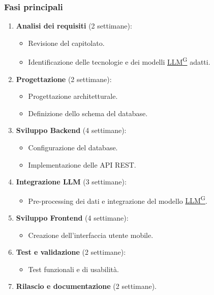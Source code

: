 \documentclass{article}
\begin{document}
                \subsubsection{Fasi principali}  %
                \begin{enumerate}
                    \item \textbf{Analisi dei requisiti} (2 settimane):
                    \begin{itemize}
                        \item Revisione del capitolato.
                        \item Identificazione delle tecnologie e dei modelli \href{https://code7crusaders.github.io/docs/RTB/documentazione_interna/glossario.html#llm-large-language-model}{LLM\textsuperscript{G}} adatti.
                    \end{itemize}
                    \item \textbf{Progettazione} (2 settimane):
                    \begin{itemize}
                        \item Progettazione architetturale.
                        \item Definizione dello schema del database.
                    \end{itemize}
                    \item \textbf {Sviluppo Backend} (4 settimane):
                    \begin{itemize}
                        \item Configurazione del database.
                        \item Implementazione delle API REST.
                    \end{itemize}
                    \item \textbf{Integrazione LLM} (3 settimane):
                    \begin{itemize}
                        \item Pre-processing dei dati e integrazione del modello \href{https://code7crusaders.github.io/docs/RTB/documentazione_interna/glossario.html#llm-large-language-model}{LLM\textsuperscript{G}}.
                    \end{itemize}
                    \item \textbf{Sviluppo Frontend} (4 settimane):
                    \begin{itemize}
                        \item Creazione dell'interfaccia utente mobile.
                    \end{itemize}
                    \item \textbf{Test e validazione} (2 settimane):
                    \begin{itemize}
                        \item Test funzionali e di usabilità.
                    \end{itemize}
                    \item \textbf{Rilascio e documentazione} (2 settimane).
                \end{enumerate}
        
\end{document}
